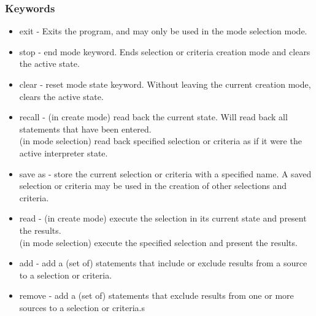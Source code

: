 \subsubsection{Keywords}
\begin{itemize}
\item exit - Exits the program, and may only be used in the mode selection mode.
\item stop - end mode keyword. Ends selection or criteria creation mode and clears the active state.
\item clear - reset mode state keyword. Without leaving the current creation mode, clears the active state.
\item recall - (in create mode) read back the current state. Will read back all statements that have been entered.\\(in mode selection) read back specified selection or criteria as if it were the active interpreter state.
\item save as - store the current selection or criteria with a specified name. A saved selection or criteria may be used in the creation of other selections and criteria.
\item read - (in create mode) execute the selection in its current state and present the results.\\(in mode selection) execute the specified selection and present the results.
\item add - add a (set of) statements that include or exclude results from a source to a selection or criteria.
\item remove - add a (set of) statements that exclude results from one or more sources to a selection or criteria.s
\end{itemize}
